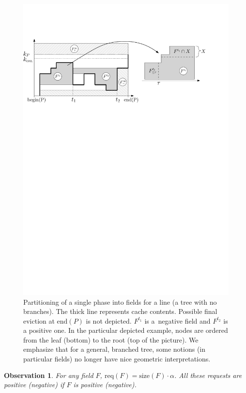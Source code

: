 \documentclass[sigconf,screen=true]{acmart}
\newtheorem{observation}[theorem]{Observation}
\newcommand{\size}{\textrm{size}}
\newcommand{\req}{\textrm{req}}
\newcommand{\enP}{\textrm{end}(P)}
\begin{document}
\begin{figure}[t]
  \centering
  \includegraphics[width=0.99\columnwidth,keepaspectratio]{images/fields_horizontal}
  \caption{Partitioning of a single phase into fields for a line (a tree with
  no branches). The thick line represents cache contents. Possible final eviction
  at $\enP$ is not depicted. $F^{t_1}$ is a~negative field and $F^{t_2}$ is a
  positive one. In the particular depicted example, nodes are ordered from the
  leaf (bottom) to the root (top  of the picture). We emphasize that for a
  general, branched tree, some notions (in particular fields) no longer have
  nice geometric interpretations.}
  \label{fig:fields}
\end{figure}


\begin{observation}
\label{obs:field_requests}
For any field $F$, $\req(F) = \size(F) \cdot \alpha$. All these requests are
positive (negative) if $F$ is positive (negative).
\end{observation}
\end{document}
